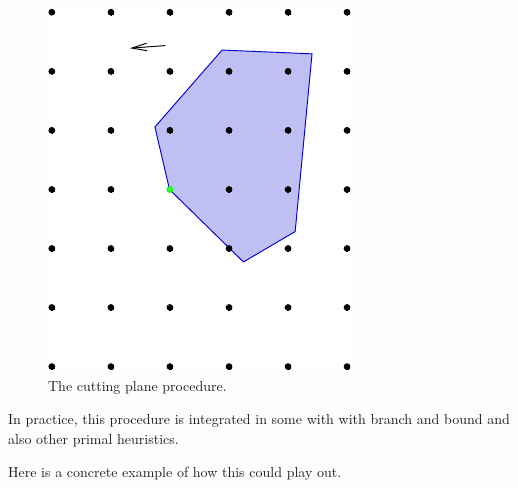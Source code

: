 \begin{figure}[H]
\vspace{0.3cm}
\includegraphics[scale = 0.4]{optimization/figures/figures-static/figureCutttingPlane7}
\caption{The cutting plane procedure.}
\label{fig:cutting-plane-procudure}
\end{figure}

In practice, this procedure is integrated in some with with branch and bound and also other primal heuristics.


Here is a concrete example of how this could play out.

